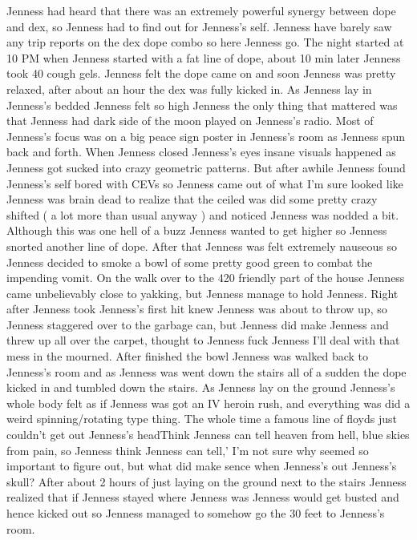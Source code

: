 \documentclass[12pt]{book}
\begin{document}
Jenness had heard that there was an extremely powerful synergy between dope and dex, so Jenness had to find out for Jenness's self. Jenness have barely saw any trip reports on the dex dope combo so here Jenness go. The night started at 10 PM when Jenness started with a fat line of dope, about 10 min later Jenness took 40 cough gels. Jenness felt the dope came on and soon Jenness was pretty relaxed, after about an hour the dex was fully kicked in. As Jenness lay in Jenness's bedded Jenness felt so high Jenness the only thing that mattered was that Jenness had dark side of the moon played on Jenness's radio. Most of Jenness's focus was on a big peace sign poster in Jenness's room as Jenness spun back and forth. When Jenness closed Jenness's eyes insane visuals happened as Jenness got sucked into crazy geometric patterns. But after awhile Jenness found Jenness's self bored with CEVs so Jenness came out of what I'm sure looked like Jenness was brain dead to realize that the ceiled was did some pretty crazy shifted ( a lot more than usual anyway ) and noticed Jenness was nodded a bit. Although this was one hell of a buzz Jenness wanted to get higher so Jenness snorted another line of dope. After that Jenness was felt extremely nauseous so Jenness decided to smoke a bowl of some pretty good green to combat the impending vomit. On the walk over to the 420 friendly part of the house Jenness came unbelievably close to yakking, but Jenness manage to hold Jenness. Right after Jenness took Jenness's first hit knew Jenness was about to throw up, so Jenness staggered over to the garbage can, but Jenness did make Jenness and threw up all over the carpet, thought to Jenness fuck Jenness I'll deal with that mess in the mourned. After finished the bowl Jenness was walked back to Jenness's room and as Jenness was went down the stairs all of a sudden the dope kicked in and tumbled down the stairs. As Jenness lay on the ground Jenness's whole body felt as if Jenness was got an IV heroin rush, and everything was did a weird spinning/rotating type thing. The whole time a famous line of floyds just couldn't get out Jenness's headThink Jenness can tell heaven from hell, blue skies from pain, so Jenness think Jenness can tell,' I'm not sure why seemed so important to figure out, but what did make sence when Jenness's out Jenness's skull? After about 2 hours of just laying on the ground next to the stairs Jenness realized that if Jenness stayed where Jenness was Jenness would get busted and hence kicked out so Jenness managed to somehow go the 30 feet to Jenness's room.
\end{document}
